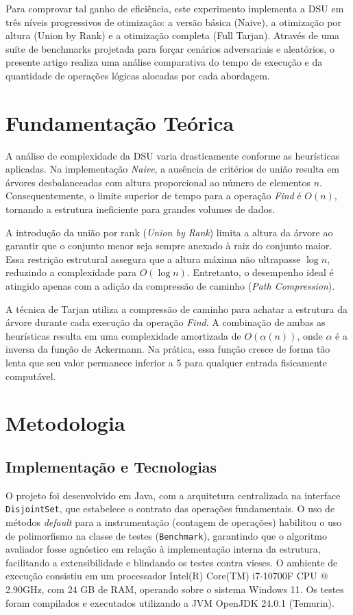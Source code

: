 \documentclass[12pt]{article}
\begin{document}
Para comprovar tal ganho de eficiência, este experimento implementa a DSU em três níveis progressivos de otimização: a versão básica (Naive), a otimização por altura (Union by Rank) e a otimização completa (Full Tarjan). Através de uma suíte de benchmarks projetada para forçar cenários adversariais e aleatórios, o presente artigo realiza uma análise comparativa do tempo de execução e da quantidade de operações lógicas alocadas por cada abordagem.

\section{Fundamentação Teórica}

A análise de complexidade da DSU varia drasticamente conforme as heurísticas aplicadas. Na implementação \textit{Naive}, a ausência de critérios de união resulta em árvores desbalanceadas com altura proporcional ao número de elementos $n$. Consequentemente, o limite superior de tempo para a operação \textit{Find} é $O(n)$, tornando a estrutura ineficiente para grandes volumes de dados.

A introdução da união por rank (\textit{Union by Rank}) limita a altura da árvore ao garantir que o conjunto menor seja sempre anexado à raiz do conjunto maior. Essa restrição estrutural assegura que a altura máxima não ultrapasse $\log n$, reduzindo a complexidade para $O(\log n)$. Entretanto, o desempenho ideal é atingido apenas com a adição da compressão de caminho (\textit{Path Compression}).

A técnica de Tarjan utiliza a compressão de caminho para achatar a estrutura da árvore durante cada execução da operação \textit{Find}. A combinação de ambas as heurísticas resulta em uma complexidade amortizada de $O(\alpha(n))$, onde $\alpha$ é a inversa da função de Ackermann. Na prática, essa função cresce de forma tão lenta que seu valor permanece inferior a 5 para qualquer entrada fisicamente computável.

\section{Metodologia}

\subsection{Implementação e Tecnologias}
O projeto foi desenvolvido em Java, com a arquitetura centralizada na interface \texttt{DisjointSet}, que estabelece o contrato das operações fundamentais. O uso de métodos \textit{default} para a instrumentação (contagem de operações) habilitou o uso de polimorfismo na classe de testes (\texttt{Benchmark}), garantindo que o algoritmo avaliador fosse agnóstico em relação à implementação interna da estrutura, facilitando a extensibilidade e blindando os testes contra vieses. O ambiente de execução consistiu em um processador Intel(R) Core(TM) i7-10700F CPU @ 2.90GHz, com 24 GB de RAM, operando sobre o sistema Windows 11. Os testes foram compilados e executados utilizando a JVM OpenJDK 24.0.1 (Temurin).
\end{document}
